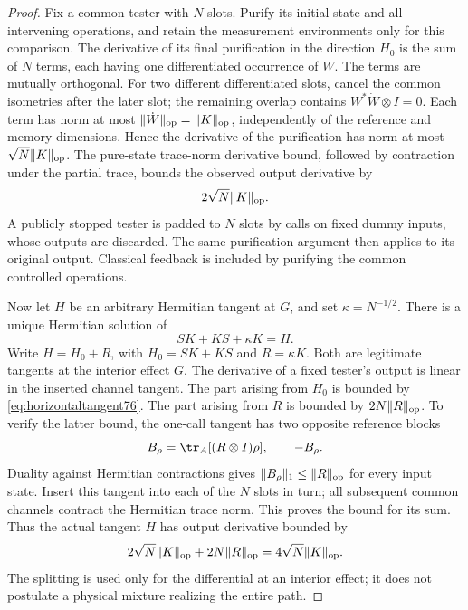 \begin{proof}
Fix a common tester with $N$ slots.  Purify its initial state and
all intervening operations, and retain the measurement environments
only for this comparison.  The derivative of its final purification
in the direction $H_0$ is the sum of $N$ terms, each having one
differentiated occurrence of $W$.  The terms are mutually orthogonal.
For two different differentiated slots, cancel the common isometries
after the later slot; the remaining overlap contains
$W^*\dot W\otimes I=0$.  Each term has norm at most
$\|\dot W\|_{\rm op}=\|K\|_{\rm op}$, independently of the
reference and memory dimensions.  Hence the derivative of the
purification has norm at most $\sqrt N\|K\|_{\rm op}$.
The pure-state trace-norm derivative bound, followed by contraction
under the partial trace, bounds the observed output derivative by
\begin{equation}\label{eq:horizontaltangent76}
 2\sqrt N\|K\|_{\rm op}.
\end{equation}
A publicly stopped tester is padded to $N$ slots by calls on fixed
dummy inputs, whose outputs are discarded.  The same purification
argument then applies to its original output.  Classical feedback is
included by purifying the common controlled operations.

Now let $H$ be an arbitrary Hermitian tangent at $G$, and set
$\kappa=N^{-1/2}$.  There is a unique Hermitian solution of
\begin{equation}\label{eq:regularizedsylvester76}
 SK+KS+\kappa K=H.
\end{equation}
Write $H=H_0+R$, with $H_0=SK+KS$ and $R=\kappa K$.
Both are legitimate tangents at the interior effect $G$.  The
derivative of a fixed tester's output is linear in the inserted
channel tangent.  The part arising from $H_0$ is bounded by
\eqref{eq:horizontaltangent76}.  The part arising from $R$ is
bounded by $2N\|R\|_{\rm op}$.  To verify the latter bound,
the one-call tangent has two opposite reference blocks
\[
 B_\rho=\tr_A[(R\otimes I)\rho],\qquad -B_\rho.
\]
Duality against Hermitian contractions gives
$\|B_\rho\|_1\le\|R\|_{\rm op}$ for every input state.
Insert this tangent into each of the $N$ slots in turn; all
subsequent common channels contract the Hermitian trace norm.
This proves the bound for its sum.  Thus the actual tangent $H$
has output derivative bounded by
\begin{equation}\label{eq:regularizedtangent76}
 2\sqrt N\|K\|_{\rm op}+2N\|R\|_{\rm op}
                         =4\sqrt N\|K\|_{\rm op}.
\end{equation}
The splitting is used only for the differential at an interior
effect; it does not postulate a physical mixture realizing the
entire path.


\end{proof}
